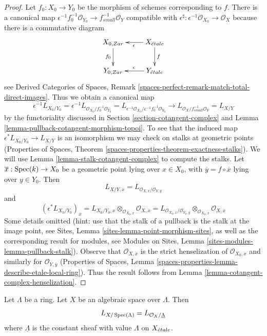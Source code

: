 \begin{proof}
Let $f_0 : X_0 \to Y_0$ be the morphism of schemes corresponding to $f$.
There is a canonical map
$\epsilon^{-1}f_0^{-1}\mathcal{O}_{Y_0} \to f_{small}^{-1}\mathcal{O}_Y$
compatible with
$\epsilon^\sharp : \epsilon^{-1}\mathcal{O}_{X_0} \to \mathcal{O}_X$
because there is a commutative diagram
$$
\xymatrix{
X_{0, Zar} \ar[d]_{f_0} & X_\etale \ar[l]^\epsilon \ar[d]^f \\
Y_{0, Zar} & Y_\etale \ar[l]_\epsilon
}
$$
see Derived Categories of Spaces, Remark
\ref{spaces-perfect-remark-match-total-direct-images}.
Thus we obtain a canonical map
$$
\epsilon^{-1}L_{X_0/Y_0} =
\epsilon^{-1}L_{\mathcal{O}_{X_0}/f_0^{-1}\mathcal{O}_{Y_0}} =
L_{\epsilon^{-1}\mathcal{O}_{X_0}/\epsilon^{-1}f_0^{-1}\mathcal{O}_{Y_0}}
\longrightarrow
L_{\mathcal{O}_X/f^{-1}_{small}\mathcal{O}_Y} = L_{X/Y}
$$
by the functoriality discussed in Section \ref{section-cotangent-complex}
and Lemma \ref{lemma-pullback-cotangent-morphism-topoi}.
To see that the induced map $\epsilon^*L_{X_0/Y_0} \to L_{X/Y}$ is an
isomorphism we may check on stalks at geometric points
(Properties of Spaces, Theorem
\ref{spaces-properties-theorem-exactness-stalks}).
We will use Lemma \ref{lemma-stalk-cotangent-complex}
to compute the stalks. Let $\overline{x} : \mathop{\mathrm{Spec}}(k) \to X_0$
be a geometric point lying over $x \in X_0$, with
$\overline{y} = f \circ \overline{x}$ lying over $y \in Y_0$. Then
$$
L_{X/Y, \overline{x}} =
L_{\mathcal{O}_{X, \overline{x}}/\mathcal{O}_{Y, \overline{y}}}
$$
and
$$
(\epsilon^*L_{X_0/Y_0})_{\overline{x}} =
L_{X_0/Y_0, x} \otimes_{\mathcal{O}_{X_0, x}}
\mathcal{O}_{X, \overline{x}} =
L_{\mathcal{O}_{X_0, x}/\mathcal{O}_{Y_0, y}}
\otimes_{\mathcal{O}_{X_0, x}} \mathcal{O}_{X, \overline{x}}
$$
Some details omitted (hint: use that the stalk of a pullback
is the stalk at the image point, see
Sites, Lemma \ref{sites-lemma-point-morphism-sites},
as well as the corresponding result for modules, see
Modules on Sites, Lemma \ref{sites-modules-lemma-pullback-stalk}).
Observe that $\mathcal{O}_{X, \overline{x}}$ is the strict
henselization of $\mathcal{O}_{X_0, x}$ and similarly
for $\mathcal{O}_{Y, \overline{y}}$
(Properties of Spaces, Lemma
\ref{spaces-properties-lemma-describe-etale-local-ring}).
Thus the result follows from
Lemma \ref{lemma-cotangent-complex-henselization}.
\end{proof}

\begin{lemma}
\label{lemma-space-over-ring}
Let $\Lambda$ be a ring. Let $X$ be an algebraic space over $\Lambda$.
Then
$$
L_{X/\mathop{\mathrm{Spec}}(\Lambda)} = L_{\mathcal{O}_X/\underline{\Lambda}}
$$
where $\underline{\Lambda}$ is the constant sheaf with value
$\Lambda$ on $X_{\acute{e}tale}$.
\end{lemma}

